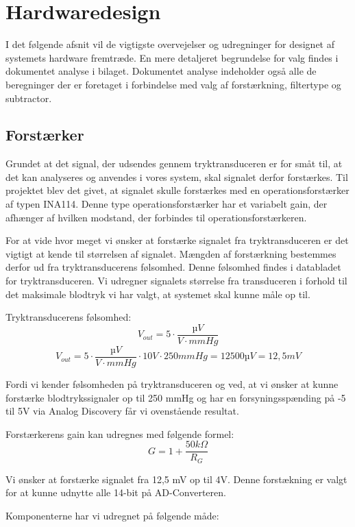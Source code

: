 \section{Hardwaredesign}
\vspace{0.5cm}
I det følgende afsnit vil de vigtigste overvejelser og udregninger for designet af systemets hardware fremtræde. En mere detaljeret begrundelse for valg findes i dokumentet analyse i bilaget. Dokumentet analyse indeholder også alle de beregninger der er foretaget i forbindelse med valg af forstærkning, filtertype og subtractor.

\subsection{Forstærker}
\vspace{0.5cm}
Grundet at det signal, der udsendes gennem tryktransduceren er for småt til, at det kan analyseres og anvendes i vores system, skal signalet derfor forstærkes. Til projektet blev det givet, at signalet skulle forstærkes med en operationsforstærker af typen INA114. Denne type operationsforstærker har et variabelt gain, der afhænger af hvilken modstand, der forbindes til operationsforstærkeren.

For at vide hvor meget vi ønsker at forstærke signalet fra tryktransduceren er det vigtigt at kende til størrelsen af signalet. Mængden af forstærkning bestemmes derfor ud fra tryktransducerens følsomhed. Denne følsomhed findes i databladet for tryktransduceren. Vi udregner signalets størrelse fra transduceren i forhold til det maksimale blodtryk vi har valgt, at systemet skal kunne måle op til.

Tryktransducerens følsomhed:
\[ V_{out} =5\cdot\frac{µV}{V\cdot mmHg}\]  
\[ V_{out} =5\cdot\frac{µV}{V\cdot mmHg} \cdot 10 V \cdot 250 mmHg = 12500 µV = 12,5 mV\]

Fordi vi kender følsomheden på tryktransduceren og ved, at vi ønsker at kunne forstærke blodtrykssignaler op til 250 mmHg og har en forsyningsspænding på -5 til 5V via Analog Discovery får vi ovenstående resultat.

Forstærkerens gain kan udregnes med følgende formel: 
\[ G = 1+\frac{50k\Omega}{R_{G}} \]

Vi ønsker at forstærke signalet fra 12,5 mV op til 4V. Denne forstækning er valgt for at kunne udnytte alle 14-bit på AD-Converteren.

Komponenterne har vi udregnet på følgende måde:

   

